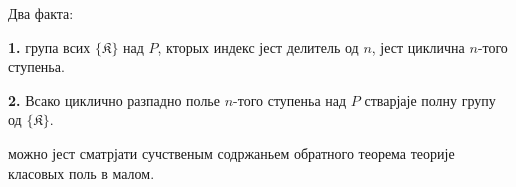 \documentclass[11pt]{article}
\begin{document}
Два факта:

\noindent\textbf{1.} група всих \(\{\mathfrak K\}\) над \(P\), кторых индекс јест делитель од \(n\), јест циклична \(n\)-того ступеньа.

\noindent\textbf{2.} Всако циклично разпадно полье \(n\)-того ступеньа над \(P\) стварјаје полну групу од \(\{\mathfrak K\}\).

можно јест сматрјати сучственым содржаньем обратного теорема теорије класовых поль в малом.


\clearpage
\end{document}
